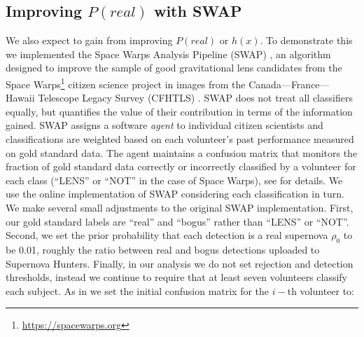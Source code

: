 \documentclass[a4paper,fleqn,usenatbib]{mnras}
\begin{document}
\subsection{Improving $P(real)$ with SWAP} 
We also expect to gain from improving $P(real)$ or $h(x)$.  To demonstrate this we implemented the Space Warps Analysis Pipeline (SWAP) \citep{Marshall16}, an algorithm designed to improve the sample of good gravitational lens candidates from the Space Warps\footnote{\url{https://spacewarps.org}} citizen science project in images from the Canada--–France--–Hawaii Telescope Legacy Survey (CFHTLS) \citep{Gwyn12}.  SWAP does not treat all classifiers equally, but quantifies the value of their contribution in terms of the information gained.  SWAP assigns a software \emph{agent} to individual citizen scientists and classifications are weighted based on each volunteer's past performance measured on gold standard data.  The agent maintains a confusion matrix that monitors the fraction of gold standard data correctly or incorrectly classified by a volunteer for each class (``LENS'' or ``NOT'' in the case of Space Warps), see \citet{Marshall16} for details.   We use the online implementation of SWAP considering each classification in turn.  
We make several small adjustments to the original SWAP  implementation.  First, our gold standard labels are ``real'' and ``bogus'' rather than ``LENS'' or ``NOT''.  Second, we set the prior probability that each detection is a real supernova $\rho_0$ to be 0.01, roughly the ratio between real and bogus detections uploaded to Supernova Hunters.  Finally, in our analysis we do not set rejection and detection thresholds, instead we continue to require that at least seven volunteers classify each subject.  As in \citet{Marshall16} we set the initial confusion matrix for the $i-$th volunteer to:\\
\end{document}
